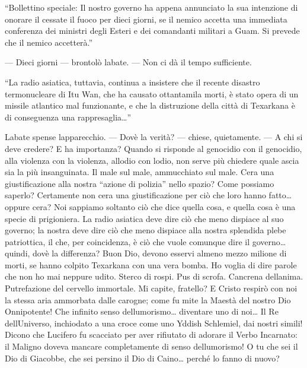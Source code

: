 ``Bollettino speciale: Il nostro governo ha appena annunciato la sua
intenzione di onorare il cessate il fuoco per dieci giorni, se il nemico
accetta una immediata conferenza dei ministri degli Esteri e dei
comandanti militari a Guam. Si prevede che il nemico accetterà.''

--- Dieci giorni --- brontolò l\textquotesingle abate. --- Non ci dà il
tempo sufficiente.

``La radio asiatica, tuttavia, continua a insistere che il recente
disastro termonucleare di Itu Wan, che ha causato ottantamila morti, è
stato opera di un missile atlantico mal funzionante, e che la
distruzione della città di Texarkana è di conseguenza una
rappresaglia\ldots''

L\textquotesingle abate spense l\textquotesingle apparecchio. ---
Dov\textquotesingle è la verità? --- chiese, quietamente. --- A chi si
deve credere? E ha importanza? Quando si risponde al genocidio con il
genocidio, alla violenza con la violenza, all\textquotesingle odio con
l\textquotesingle odio, non serve più chiedere quale ascia sia la più
insanguinata. Il male sul male, ammucchiato sul male.
C\textquotesingle era una giustificazione alla nostra ``azione di
polizia'' nello spazio? Come possiamo saperlo? Certamente non
c\textquotesingle era una giustificazione per ciò che loro hanno
fatto\ldots{} oppure c\textquotesingle era? Noi sappiamo soltanto ciò
che dice quella cosa, e quella cosa è una specie di prigioniera. La
radio asiatica deve dire ciò che meno dispiace al suo governo; la nostra
deve dire ciò che meno dispiace alla nostra splendida plebe patriottica,
il che, per coincidenza, è ciò che vuole comunque dire il
governo\ldots{} quindi, dov\textquotesingle è la differenza? Buon Dio,
devono esservi almeno mezzo milione di morti, se hanno colpito Texarkana
con una vera bomba. Ho voglia di dire parole che non ho mai neppure
udito. Sterco di rospi. Pus di scrofa. Cancrena
dell\textquotesingle anima. Putrefazione del cervello immortale. Mi
capite, fratello? E Cristo respirò con noi la stessa aria ammorbata
dalle carogne; come fu mite la Maestà del nostro Dio Onnipotente! Che
infinito senso dell\textquotesingle umorismo\ldots{} diventare uno di
noi\ldots{} Il Re dell\textquotesingle Universo, inchiodato a una croce
come uno Yddish Schlemiel, dai nostri simili! Dicono che Lucifero fu
scacciato per aver rifiutato di adorare il Verbo Incarnato: il Maligno
doveva mancare completamente di senso dell\textquotesingle umorismo! O
tu che sei il Dio di Giacobbe, che sei persino il Dio di Caino\ldots{}
perché lo fanno di nuovo?

